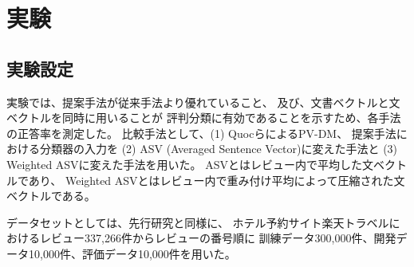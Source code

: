 \documentclass{ttisummary}
\begin{document}
\section{実験}

\subsection{実験設定}

実験では、提案手法が従来手法より優れていること、
及び、文書ベクトルと文ベクトルを同時に用いることが
評判分類に有効であることを示すため、各手法の正答率を測定した。
比較手法として、(1) Quocら\cite{quoc14}によるPV-DM、
提案手法における分類器の入力を
(2) ASV (Averaged Sentence Vector)に変えた手法と
(3) Weighted ASVに変えた手法を用いた。
ASVとはレビュー内で平均した文ベクトルであり、
Weighted ASVとはレビュー内で重み付け平均によって圧縮された文ベクトルである。


データセットとしては、先行研究\cite{fujitani15}と同様に、
ホテル予約サイト楽天トラベルにおけるレビュー337,266件からレビューの番号順に
訓練データ300,000件、開発データ10,000件、評価データ10,000件を用いた。


\end{document}
